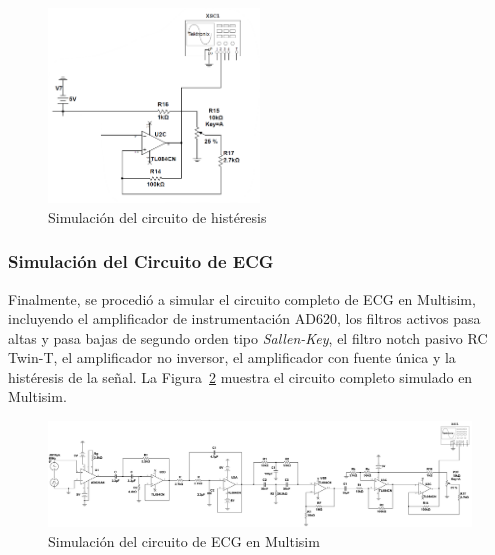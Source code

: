         \begin{figure}[H]
            \centering
            \includegraphics[width=0.5\textwidth]{img/Desarrollo/multisim_histeresis.png}
            \caption[Simulación del circuito de histéresis.]{Simulación del circuito de histéresis\footnotemark}
            \label{fig:Simulacion_Histeresis}
        \end{figure}
        
        \subsubsection{Simulación del Circuito de ECG}

        Finalmente, se procedió a simular el circuito completo de ECG en Multisim, incluyendo el amplificador de instrumentación AD620, los filtros activos pasa altas y pasa bajas de segundo orden tipo \textit{Sallen-Key}, el filtro notch pasivo RC Twin-T, el amplificador no inversor, el amplificador con fuente única y la histéresis de la señal. La Figura~\ref{fig:Simulacion_circuito_ECG} muestra el circuito completo simulado en Multisim.

        \begin{figure}[H]
            \centering
            \includegraphics[width=1.0\textwidth]{img/Desarrollo/multisim_circuito.png}
            \caption[Simulación del circuito de ECG en Multisim.]{Simulación del circuito de ECG en Multisim\footnotemark}
            \label{fig:Simulacion_circuito_ECG}
        \end{figure}

